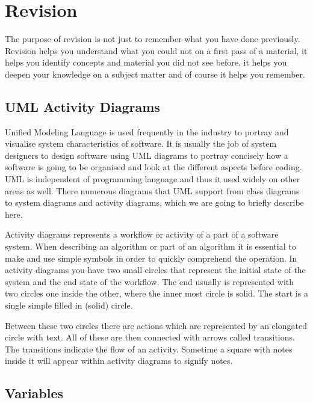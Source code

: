 \documentclass[
]{book}
\begin{document}
\hypertarget{revision}{%
\section{Revision}\label{revision}}

The purpose of revision is not just to remember what you have done previously. Revision helps you understand what you could not on a first pass of a material, it helps you identify concepts and material you did not see before, it helps you deepen your knowledge on a subject matter and of course it helps you remember.

\hypertarget{uml-activity-diagrams}{%
\subsection{UML Activity Diagrams}\label{uml-activity-diagrams}}

Unified Modeling Language is used frequently in the industry to portray and visualise system characteristics of software. It is usually the job of system designers to design software using UML diagrams to portray concisely how a software is going to be organised and look at the different aspects before coding. UML is independent of programming language and thus it used widely on other areas as well. There numerous diagrams that UML support from class diagrams to system diagrams and activity diagrams, which we are going to briefly describe here.

Activity diagrams represents a workflow or activity of a part of a software system. When describing an algorithm or part of an algorithm it is essential to make and use simple symbols in order to quickly comprehend the operation. In activity diagrams you have two small circles that represent the initial state of the system and the end state of the workflow. The end usually is represented with two circles one inside the other, where the inner most circle is solid. The start is a single simple filled in (solid) circle.

Between these two circles there are actions which are represented by an elongated circle with text. All of these are then connected with arrows called transitions. The transitions indicate the flow of an activity. Sometime a square with notes inside it will appear within activity diagrams to signify notes.

\hypertarget{variables}{%
\subsection{Variables}\label{variables}}
\end{document}
